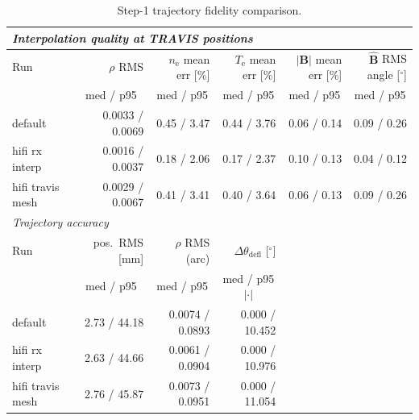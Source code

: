 \begin{table}[htbp]
\centering
\small
\caption{Step-1 trajectory fidelity comparison.}
\label{tab:step1_fidelity}
\begin{tabular}{lrrrrr}
\toprule
\multicolumn{6}{l}{\textit{Interpolation quality at TRAVIS positions}} \\
\midrule
Run & $\rho$ RMS & $n_{\mathrm{e}}$ mean err [\%] & $T_{\mathrm{e}}$ mean err [\%] & $|\bm{B}|$ mean err [\%] & $\hat{\bm{B}}$ RMS angle [$^\circ$] \\
 & \multicolumn{1}{c}{med / p95} & \multicolumn{1}{c}{med / p95} & \multicolumn{1}{c}{med / p95} & \multicolumn{1}{c}{med / p95} & \multicolumn{1}{c}{med / p95} \\
\midrule
default & 0.0033 / 0.0069 & 0.45 / 3.47 & 0.44 / 3.76 & 0.06 / 0.14 & 0.09 / 0.26 \\
hifi rx interp & 0.0016 / 0.0037 & 0.18 / 2.06 & 0.17 / 2.37 & 0.10 / 0.13 & 0.04 / 0.12 \\
hifi travis mesh & 0.0029 / 0.0067 & 0.41 / 3.41 & 0.40 / 3.64 & 0.06 / 0.13 & 0.09 / 0.26 \\
\midrule
\multicolumn{6}{l}{\textit{Trajectory accuracy}} \\
\midrule
Run & pos.\ RMS [mm] & $\rho$ RMS (arc) & $\Delta\theta_{\mathrm{defl}}$ [$^\circ$] \\
 & \multicolumn{1}{c}{med / p95} & \multicolumn{1}{c}{med / p95} & \multicolumn{1}{c}{med / p95$|\cdot|$} \\
\midrule
default & 2.73 / 44.18 & 0.0074 / 0.0893 & 0.000 / 10.452 \\
hifi rx interp & 2.63 / 44.66 & 0.0061 / 0.0904 & 0.000 / 10.976 \\
hifi travis mesh & 2.76 / 45.87 & 0.0073 / 0.0951 & 0.000 / 11.054 \\
\bottomrule
\end{tabular}
\end{table}
